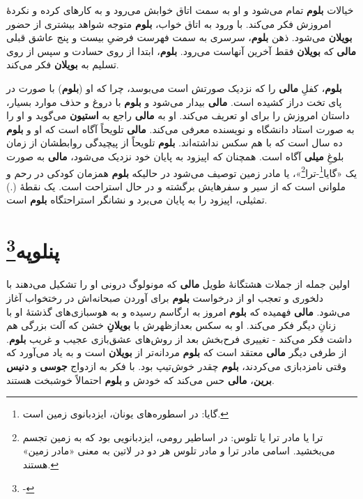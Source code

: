 \documentclass[12pt]{book}
\newcommand{\noun}[1]{{\textbf{#1}}}
\begin{document}
    خیالات \noun{بلوم} تمام می‌شود و او به سمت اتاق خوابش می‌رود و به کارهای کرده و نکردهٔ امروزش فکر می‌کند. با ورود به اتاق خواب، \noun{بلوم} متوجه شواهد بیشتری از حضور \noun{بویلان} می‌شود. ذهن \noun{بلوم}، سرسری به سمت فهرست فرضیِ بیست و پنج عاشق قبلی \noun{مالی} که \noun{بویلان} فقط آخرین آنهاست می‌رود. \noun{بلوم}، ابتدا از روی حسادت و سپس از روی تسلیم به \noun{بویلان} فکر می‌کند.

    \noun{بلوم}، کفلِ \noun{مالی} را که نزدیک صورتش است می‌بوسد، چرا که او (\noun{بلوم}) با صورت در پای تخت دراز کشیده است. \noun{مالی} بیدار می‌شود و \noun{بلوم} با دروغ و حذف موارد بسیار، داستان امروزش را برای او تعریف می‌کند. او به \noun{مالی} راجع به \noun{استیون} می‌گوید و او را به صورت استاد دانشگاه و نویسنده معرفی می‌کند. \noun{مالی} تلویحاً آگاه است  که او و \noun{بلوم} ده سال است که با هم سکس نداشته‌اند. \noun{بلوم} تلویحاً از پیچیدگی روابطشان از زمان بلوغِ \noun{میلی} آگاه است. همچنان که اپیزود به پایان خود نزدیک می‌شود، \noun{مالی} به صورت یک «گایا\footnote{گایا: در اسطوره‌های یونان، ایزدبانوی زمین است.}-ترا\footnote{ترا یا مادر ترا یا تلوس: در اساطیر رومی، ایزدبانویی بود که به زمین تجسم می‌بخشید. اسامی مادر ترا و مادر تلوس هر دو در لاتین به معنی «مادر زمین» هستند.}»، یا مادر زمین توصیف می‌شود در حالیکه \noun{بلوم} همزمان کودکی در رحم و ملوانی است که از سیر و سفرهایش برگشته و در حال استراحت است. یک نقطهٔ (.) تمثیلی، اپیزود را به پایان می‌برد و نشانگر استراحتگاه \noun{بلوم} است.

    \chapter[پنلوپه]{پنلوپه\protect\footnote{-}}\label{ep:18}
    اولین جمله از جملات هشتگانهٔ طویل \noun{مالی} که مونولوگ درونی او را تشکیل می‌دهند با دلخوری و تعجب او از درخواست \noun{بلوم} برای آوردن صبحانه‌اش در رختخواب آغاز می‌شود. \noun{مالی} فهمیده که \noun{بلوم} امروز به ارگاسم رسیده و به هوسبازی‌های گذشتهٔ او با زنانِ دیگر فکر می‌کند. او به سکس بعدازظهرش با \noun{بویلانِ} خشن که آلت بزرگی هم داشت فکر می‌کند - تغییری فرح‌بخش بعد از روش‌های عشق‌بازی عجیب و غریب \noun{بلوم}. از طرفی دیگر \noun{مالی} معتقد است که \noun{بلوم} مردانه‌تر از \noun{بویلان} است و به یاد می‌آورد که وقتی نامزدبازی می‌کردند، \noun{بلوم} چقدر خوش‌تیپ بود. با فکر به ازدواج \noun{جوسی} و \noun{دنیس برین}، \noun{مالی} حس می‌کند که خودش و \noun{بلوم} احتمالاً خوشبخت هستند.
\end{document}

